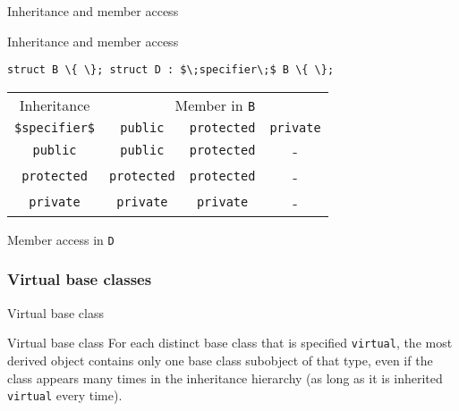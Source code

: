 \begin{frame}{Inheritance and member access}{}
  \begin{block}{Inheritance and member access}
    \begin{center}
      \lstinline[mathescape]!struct B \{ \}; struct D : $\;specifier\;$ B \{ \};!

      \bigskip

      \begin{tabular}{|c|c|c|c|}
      \hline
      Inheritance           & \multicolumn{3}{|c|}{Member in \lstinline!B!} \\
      \lstinline[mathescape]!$specifier$! & \lstinline!public!    & \lstinline!protected! & \lstinline!private! \\
      \hline
      \lstinline!public!    & \lstinline!public!    & \lstinline!protected! & - \\
      \lstinline!protected! & \lstinline!protected! & \lstinline!protected! & - \\
      \lstinline!private!   & \lstinline!private!   & \lstinline!private!   & - \\
      \hline
      \end{tabular}

      Member access in \lstinline!D!
    \end{center}
  \end{block}
\end{frame}

\subsubsection{Virtual base classes}

\begin{frame}{Virtual base class}{}
  \begin{block}{Virtual base class}
    For each distinct base class that is specified \lstinline!virtual!, the most derived object contains only one base class subobject of that type, even if the class appears many times in the inheritance hierarchy (as long as it is inherited \lstinline!virtual! every time).
  \end{block}

  \begin{example}
    \begin{center}
    \end{center}
  \end{example}
\end{frame}

